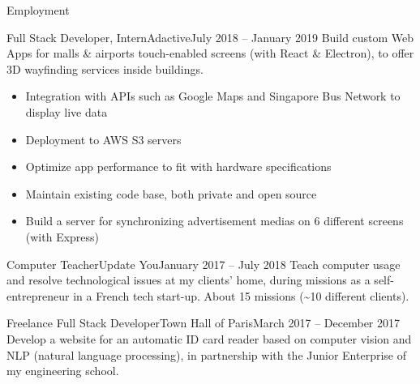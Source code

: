 \documentclass[]{mcdowellcv}
\begin{document}
    \makeheader

    \begin{cvsection}{Employment}

        \begin{cvsubsection}{Full Stack Developer, Intern}{Adactive}{July 2018 -- January 2019}
            Build custom Web Apps for malls \& airports touch-enabled screens (with React \& Electron), to offer 3D wayfinding services inside buildings.
            \begin{itemize}
                \item Integration with APIs such as Google Maps and Singapore Bus Network to display live data
                \item Deployment to AWS S3 servers
                \item Optimize app performance to fit with hardware specifications
                \item Maintain existing code base, both private and open source
                \item Build a server for synchronizing advertisement medias on 6 different screens (with Express)
            \end{itemize}
        \end{cvsubsection}

        \begin{cvsubsection}{Computer Teacher}{Update You}{January 2017 -- July 2018}
            Teach computer usage and resolve technological issues at my clients' home, during missions as a self-entrepreneur in a French tech start-up.
            About 15 missions (\textasciitilde 10 different clients).
        \end{cvsubsection}

        \begin{cvsubsection}{Freelance Full Stack Developer}{Town Hall of Paris}{March 2017 -- December 2017}
            Develop a website for an automatic ID card reader based on computer vision and NLP (natural language processing), in partnership with the Junior Enterprise of my engineering school.
        \end{cvsubsection}

    \end{cvsection}
\end{document}
